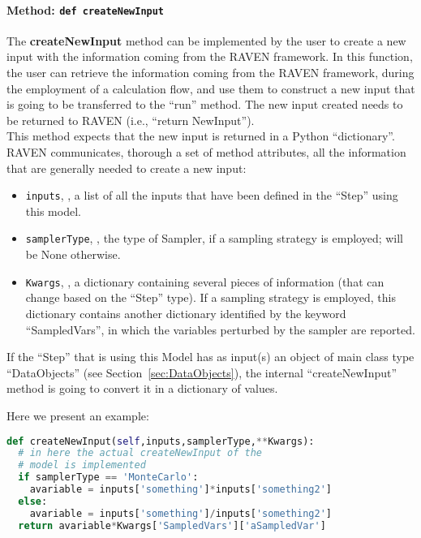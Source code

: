 \paragraph{Method: \texttt{def createNewInput}}
\label{subsubsubsec:externalcreateNewInput}
The \textbf{createNewInput} method can be implemented by the user to create a
new input with the information coming from the RAVEN framework.
%
In this function, the user can retrieve the information coming from the RAVEN
framework, during the employment of a calculation flow, and use them to
construct a new input that is going to be transferred to the ``run'' method.
%
The new input created needs to be returned to RAVEN (i.e., ``return NewInput'').
\\This method expects that the new input is returned in a Python ``dictionary''.
%
RAVEN communicates, thorough a set of method attributes, all the information
that are generally needed to create a new input:
\begin{itemize}
  \item \texttt{inputs}, , a list of all the inputs that
  have been defined in the ``Step'' using this model.
  \item \texttt{samplerType}, , the type of Sampler, if a
  sampling strategy is employed; will be None otherwise.
  \item \texttt{Kwargs}, , a dictionary containing several
  pieces of information (that can change based on the ``Step'' type).
  If a sampling strategy is employed, this dictionary contains another
  dictionary identified by the keyword ``SampledVars'', in which the variables
  perturbed by the sampler are reported.
\end{itemize}
\nb If the ``Step'' that is using this Model has as input(s) an object of main
class type ``DataObjects'' (see Section~\ref{sec:DataObjects}), the internal ``createNewInput''
method is going to convert it in a dictionary of values.
%

Here we present an example:
\begin{lstlisting}[language=python]
def createNewInput(self,inputs,samplerType,**Kwargs):
  # in here the actual createNewInput of the
  # model is implemented
  if samplerType == 'MonteCarlo':
    avariable = inputs['something']*inputs['something2']
  else:
    avariable = inputs['something']/inputs['something2']
  return avariable*Kwargs['SampledVars']['aSampledVar']
\end{lstlisting}

